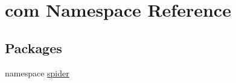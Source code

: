 \hypertarget{namespacecom}{\section{com \-Namespace \-Reference}
\label{namespacecom}
}
\subsection*{\-Packages}
\begin{DoxyCompactItemize}
\item 
namespace \hyperlink{namespacecom_1_1spider}{spider}
\end{DoxyCompactItemize}
